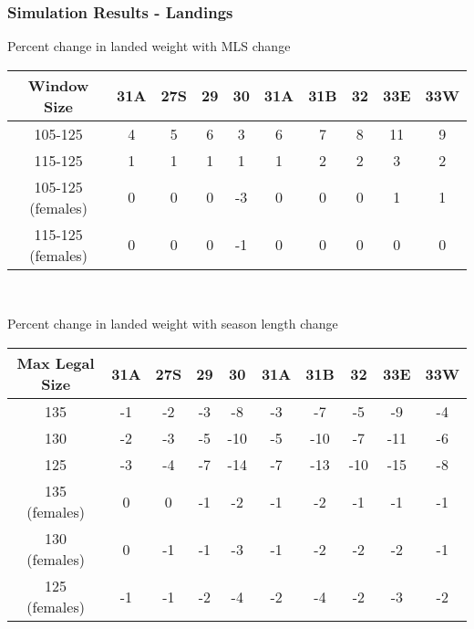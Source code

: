 \documentclass{beamer}
\begin{document}
\begin{frame}
\frametitle{Simulation Results - Landings}
Percent change in  landed weight  with MLS change 
\centering
\begin{tabular}{|c|c|c|c|c|c|c|c|c|c|}
\hline
Window Size       & 31A & 27S & 29 & 30 & 31A & 31B & 32 & 33E & 33W \\
\hline
105-125           & 4 & 5 & 6 & 3 & 6 & 7 & 8 & 11 & 9 \\
\hline
115-125           & 1 & 1 & 1 & 1 & 1 & 2 & 2 & 3 & 2 \\
\hline
105-125 (females)  & 0 & 0 & 0 & -3 & 0 & 0 & 0 & 1 & 1 \\
\hline
115-125 (females)  & 0 & 0 & 0 & -1 & 0 & 0 & 0 & 0 & 0 \\
\hline
 
\end{tabular}\\
\vspace{5mm}

Percent change in  landed weight with season length change 
\centering
\begin{tabular}{|c|c|c|c|c|c|c|c|c|c|}
\hline
Max Legal Size & 31A & 27S & 29 & 30 & 31A & 31B & 32 & 33E & 33W \\
\hline
135            & -1 & -2 & -3 & -8 & -3 & -7 & -5 & -9 & -4 \\
\hline
130            & -2 & -3 & -5 & -10 & -5 & -10 & -7 & -11 & -6 \\
\hline
125            & -3 & -4 & -7 & -14 & -7 & -13 & -10 & -15 & -8 \\
\hline
135 (females)  & 0 & 0 & -1 & -2 & -1 & -2 & -1 & -1 & -1 \\
\hline
130 (females)  & 0 & -1 & -1 & -3 & -1 & -2 & -2 & -2 & -1 \\
\hline
125 (females)   & -1 & -1 & -2 & -4 & -2 & -4 & -2 & -3 & -2 \\
\hline
 
 
\end{tabular}
\end{frame}
 
\end{document}
